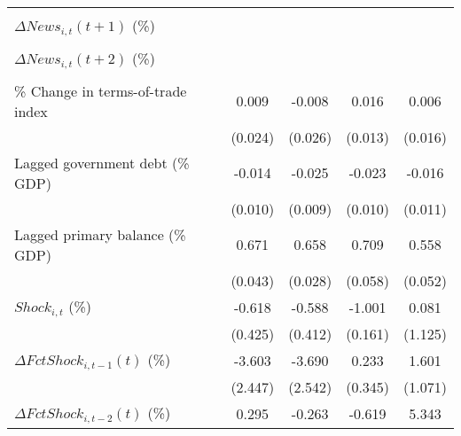 {\begin{tabular}{l*{4}{c}}
                    &                     &                     &                     &                     \\
\addlinespace
$ \Delta News_{i,t}(t+1)$ (\%)&                     &                     &                     &                     \\
                    &                     &                     &                     &                     \\
\addlinespace
$ \Delta News_{i,t}(t+2)$ (\%)&                     &                     &                     &                     \\
                    &                     &                     &                     &                     \\
\addlinespace
\% Change in terms-of-trade index&       0.009         &      -0.008         &       0.016         &       0.006         \\
                    &     (0.024)         &     (0.026)         &     (0.013)         &     (0.016)         \\
\addlinespace
Lagged government debt (\% GDP)&      -0.014         &      -0.025\sym{**} &      -0.023\sym{**} &      -0.016         \\
                    &     (0.010)         &     (0.009)         &     (0.010)         &     (0.011)         \\
\addlinespace
Lagged primary balance (\% GDP)&       0.671\sym{***}&       0.658\sym{***}&       0.709\sym{***}&       0.558\sym{***}\\
                    &     (0.043)         &     (0.028)         &     (0.058)         &     (0.052)         \\
\addlinespace
$ Shock_{i,t}$ (\%) &      -0.618         &      -0.588         &      -1.001\sym{***}&       0.081         \\
                    &     (0.425)         &     (0.412)         &     (0.161)         &     (1.125)         \\
\addlinespace
$ \Delta FctShock_{i,t-1}(t)$ (\%)&      -3.603         &      -3.690         &       0.233         &       1.601         \\
                    &     (2.447)         &     (2.542)         &     (0.345)         &     (1.071)         \\
\addlinespace
$ \Delta FctShock_{i,t-2}(t)$ (\%)&       0.295         &      -0.263         &      -0.619         &       5.343         \\

\end{tabular}}
